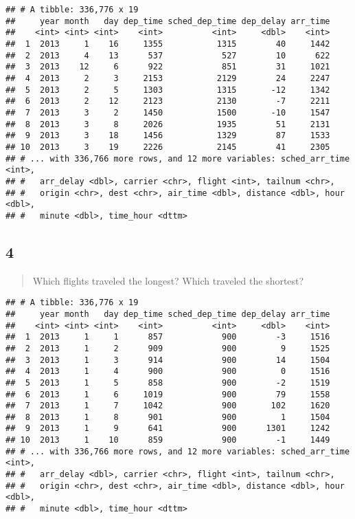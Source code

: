 \documentclass[]{article}
\newenvironment{Shaded}{\begin{snugshade}}{\end{snugshade}}
\newcommand{\KeywordTok}[1]{\textcolor[rgb]{0.13,0.29,0.53}{\textbf{#1}}}
\newcommand{\NormalTok}[1]{#1}
\newcommand{\OperatorTok}[1]{\textcolor[rgb]{0.81,0.36,0.00}{\textbf{#1}}}
\newcommand{\StringTok}[1]{\textcolor[rgb]{0.31,0.60,0.02}{#1}}
\begin{document}
\begin{verbatim}
## # A tibble: 336,776 x 19
##     year month   day dep_time sched_dep_time dep_delay arr_time
##    <int> <int> <int>    <int>          <int>     <dbl>    <int>
##  1  2013     1    16     1355           1315        40     1442
##  2  2013     4    13      537            527        10      622
##  3  2013    12     6      922            851        31     1021
##  4  2013     2     3     2153           2129        24     2247
##  5  2013     2     5     1303           1315       -12     1342
##  6  2013     2    12     2123           2130        -7     2211
##  7  2013     3     2     1450           1500       -10     1547
##  8  2013     3     8     2026           1935        51     2131
##  9  2013     3    18     1456           1329        87     1533
## 10  2013     3    19     2226           2145        41     2305
## # ... with 336,766 more rows, and 12 more variables: sched_arr_time <int>,
## #   arr_delay <dbl>, carrier <chr>, flight <int>, tailnum <chr>,
## #   origin <chr>, dest <chr>, air_time <dbl>, distance <dbl>, hour <dbl>,
## #   minute <dbl>, time_hour <dttm>
\end{verbatim}

\hypertarget{section-3}{%
\subsection{4}\label{section-3}}

\begin{quote}
Which flights traveled the longest? Which traveled the shortest?
\end{quote}

\begin{Shaded}
\end{Shaded}

\begin{verbatim}
## # A tibble: 336,776 x 19
##     year month   day dep_time sched_dep_time dep_delay arr_time
##    <int> <int> <int>    <int>          <int>     <dbl>    <int>
##  1  2013     1     1      857            900        -3     1516
##  2  2013     1     2      909            900         9     1525
##  3  2013     1     3      914            900        14     1504
##  4  2013     1     4      900            900         0     1516
##  5  2013     1     5      858            900        -2     1519
##  6  2013     1     6     1019            900        79     1558
##  7  2013     1     7     1042            900       102     1620
##  8  2013     1     8      901            900         1     1504
##  9  2013     1     9      641            900      1301     1242
## 10  2013     1    10      859            900        -1     1449
## # ... with 336,766 more rows, and 12 more variables: sched_arr_time <int>,
## #   arr_delay <dbl>, carrier <chr>, flight <int>, tailnum <chr>,
## #   origin <chr>, dest <chr>, air_time <dbl>, distance <dbl>, hour <dbl>,
## #   minute <dbl>, time_hour <dttm>
\end{verbatim}
\end{document}
